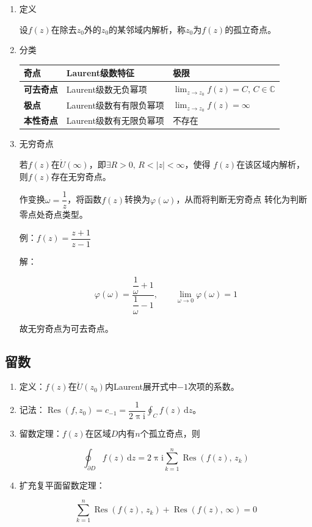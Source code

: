 \documentclass[UTF8,fontset=fandol,zihao=5]{ctexart}
\newcommand{\ii}{\mathrm{i}}
\newcommand{\CC}{\mathbb{C}}
\newcommand{\dd}{\,\mathrm{d}}
\newcommand{\Res}{\operatorname{Res}}
\begin{document}
\begin{enumerate}
  
  \item 定义
  
  设$f(z)$在除去$z_0$外的$z_0$的某邻域内解析，称$z_0$为$f(z)$的孤立奇点。

  \item 分类
  
  \begin{center}
  \begin{tabularx}{0.88\textwidth}{>{\bfseries}p{2.2cm}X X}
  \toprule
  奇点 & Laurent级数特征 & 极限 \\
  \midrule
  可去奇点 & Laurent级数无负幂项 & $\displaystyle\lim_{z\to z_0} f(z)=C,\,C\in\CC$ \\
  极点 & Laurent级数有有限负幂项 & $\displaystyle\lim_{z\to z_0} f(z)=\infty$ \\
  本性奇点 & Laurent级数有无限负幂项 & 不存在 \\
  \bottomrule
  \end{tabularx}
  \end{center}

  \item 无穷奇点
  
  若$f(z)$在$\mathring{U}(\infty)$，即$\exists R>0,\, R<|z|<\infty$，使得
  $f(z)$在该区域内解析，则$f(z)$存在无穷奇点。

  \begin{methodbox}[【技巧】判断无穷奇点类型]
    作变换$\omega=\dfrac{1}{z}$，将函数$f(z)$转换为$\varphi(\omega)$，从而将判断无穷奇点
  转化为判断零点处奇点类型。
    
    例：$f(z)=\dfrac{z+1}{z-1}$

    解：

    \[
    \varphi(\omega)=\frac{\dfrac{1}{\omega}+1}{\dfrac{1}{\omega}-1},\qquad\lim_{\omega\to0}\varphi(\omega)=1
    \]

    故无穷奇点为可去奇点。
  \end{methodbox}

\end{enumerate}

\subsection{留数}

\begin{enumerate}
  \item 定义：$f(z)$在$\mathring{U}(z_0)$内Laurent展开式中$-1$次项的系数。
  
  \item 记法：$\displaystyle\Res(f,z_0)=c_{-1}=\dfrac{1}{2\uppi\ii}\oint_{C}f(z)\dd z$。

  \item 留数定理：$f(z)$在区域$D$内有$n$个孤立奇点，则
  
  \[
  \oint_{\partial D}f(z)\dd z=2\uppi\ii\sum_{k=1}^{n}\Res(f(z),\,z_k)
  \]

  \item 扩充复平面留数定理：
  
  \[
  \sum_{k=1}^{n}\Res(f(z),\,z_k) + \Res(f(z),\,\infty) = 0
  \]
  
\end{enumerate}
\end{document}
